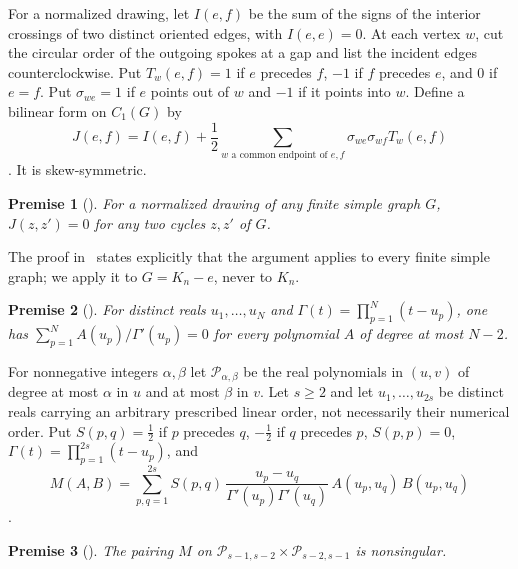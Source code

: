 \documentclass[11pt,a4paper]{article}
\newtheorem{premise}{Premise}
\theoremstyle{definition}
\theoremstyle{remark}
\numberwithin{equation}{section}
\newcommand{\PP}{\mathcal P}
\begin{document}
For a normalized drawing, let $I(e,f)$ be the sum of the signs of the interior crossings of two distinct oriented edges, with $I(e,e)=0$. At each vertex $w$, cut the circular order of the outgoing spokes at a gap and list the incident edges counterclockwise. Put $T_w(e,f)=1$ if $e$ precedes $f$, $-1$ if $f$ precedes $e$, and $0$ if $e=f$. Put $\sigma_{we}=1$ if $e$ points out of $w$ and $-1$ if it points into $w$. Define a bilinear form on $C_1(G)$ by
\begin{equation}\label{eq:J}
J(e,f)=I(e,f)+\frac12\sum_{w\text{ a common endpoint of }e,f}\sigma_{we}\sigma_{wf}T_w(e,f)
\end{equation}
\cite[equation \texttt{eq:J}]{OAIKn}. It is skew-symmetric.

\begin{premise}[{\cite[Lemma~2.1, label \texttt{lem:cycles}]{OAIKn}}]\label{U:cycles}
For a normalized drawing of any finite simple graph $G$, $J(z,z')=0$ for any two cycles $z,z'$ of $G$.
\end{premise}

The proof in~\cite{OAIKn} states explicitly that the argument applies to every finite simple graph; we apply it to $G=K_n-e$, never to $K_n$.

\begin{premise}[{\cite[Lemma~3.1, label \texttt{lem:weights}]{OAIKn}}]\label{U:weights}
For distinct reals $u_1,\dots,u_N$ and $\Gamma(t)=\prod_{p=1}^N(t-u_p)$, one has $\sum_{p=1}^N A(u_p)/\Gamma'(u_p)=0$ for every polynomial $A$ of degree at most $N-2$.
\end{premise}

For nonnegative integers $\alpha,\beta$ let $\PP_{\alpha,\beta}$ be the real polynomials in $(u,v)$ of degree at most $\alpha$ in $u$ and at most $\beta$ in $v$. Let $s\ge2$ and let $u_1,\dots,u_{2s}$ be distinct reals carrying an arbitrary prescribed linear order, not necessarily their numerical order. Put $S(p,q)=\frac12$ if $p$ precedes $q$, $-\frac12$ if $q$ precedes $p$, $S(p,p)=0$, $\Gamma(t)=\prod_{p=1}^{2s}(t-u_p)$, and
\begin{equation}\label{eq:M}
M(A,B)=\sum_{p,q=1}^{2s}S(p,q)\,\frac{u_p-u_q}{\Gamma'(u_p)\Gamma'(u_q)}\,A(u_p,u_q)\,B(u_p,u_q)
\end{equation}
\cite[equation \texttt{eq:M}]{OAIKn}.

\begin{premise}[{\cite[Lemma~3.3, label \texttt{lem:detector}, first sentence]{OAIKn}}]\label{U:detector}
The pairing $M$ on $\PP_{s-1,s-2}\times\PP_{s-2,s-1}$ is nonsingular.
\end{premise}
\end{document}
